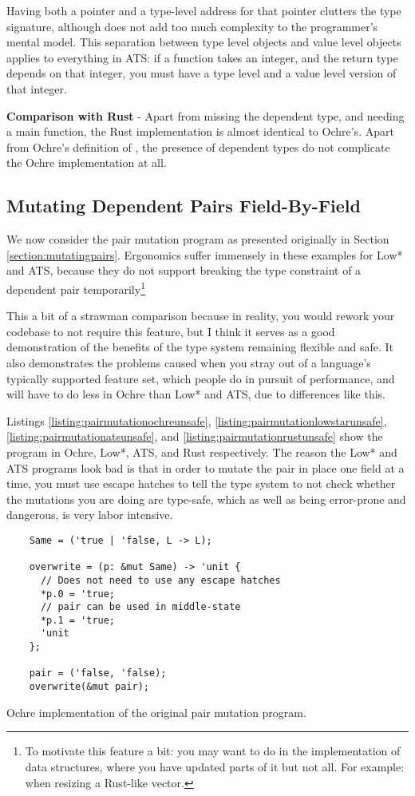 \documentclass[12pt,twoside]{report}
\begin{document}
Having both a pointer and a type-level address for that pointer clutters the type signature, although does not add too much complexity to the programmer's mental model. This separation between type level objects and value level objects applies to everything in ATS: if a function takes an integer, and the return type depends on that integer, you must have a type level and a value level version of that integer.

\textbf{Comparison with Rust} - Apart from missing the dependent type, and needing a main function, the Rust implementation is almost identical to Ochre's. Apart from Ochre's definition of , the presence of dependent types do not complicate the Ochre implementation at all.

\subsection{Mutating Dependent Pairs Field-By-Field}
We now consider the pair mutation program as presented originally in Section \ref{section:mutatingpairs}. Ergonomics suffer immensely in these examples for Low* and ATS, because they do not support breaking the type constraint of a dependent pair temporarily\footnote{To motivate this feature a bit: you may want to do in the implementation of data structures, where you have updated parts of it but not all. For example: when resizing a Rust-like vector.}

This a bit of a strawman comparison because in reality, you would rework your codebase to not require this feature, but I think it serves as a good demonstration of the benefits of the type system remaining flexible and safe. It also demonstrates the problems caused when you stray out of a language's typically supported feature set, which people do in pursuit of performance, and will have to do less in Ochre than Low* and ATS, due to differences like this.

Listings \ref{listing:pairmutationochreunsafe}, \ref{listing:pairmutationlowstarunsafe}, \ref{listing:pairmutationatsunsafe}, and \ref{listing:pairmutationrustunsafe} show the program in Ochre, Low*, ATS, and Rust respectively. The reason the Low* and ATS programs look bad is that in order to mutate the pair in place one field at a time, you must use escape hatches to tell the type system to not check whether the mutations you are doing are type-safe, which as well as being error-prone and dangerous, is very labor intensive.

\begin{listing}
  \begin{verbatim}
    Same = ('true | 'false, L -> L); 
  
    overwrite = (p: &mut Same) -> 'unit {
      // Does not need to use any escape hatches
      *p.0 = 'true;
      // pair can be used in middle-state
      *p.1 = 'true;
      'unit
    };
  
    pair = ('false, 'false);          
    overwrite(&mut pair);
  \end{verbatim}
  \caption{Ochre implementation of the original pair mutation program.}
  \label{listing:pairmutationochreunsafe}
\end{listing}
\end{document}
